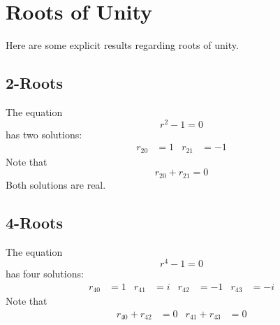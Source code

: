 \chapter{Roots of Unity}
Here are some explicit results regarding roots of unity.
\section{2-Roots}
The equation
\begin{equation}
    r^{2} - 1 = 0
\end{equation}
has two solutions:
\begin{align}
    r_{20} &= 1 & r_{21} &= {-1}
\end{align}
Note that
\begin{equation}
    r_{20} + r_{21} = 0
\end{equation}
Both solutions are real.
\section{4-Roots}
The equation
\begin{equation}
    r^{4} - 1 = 0
\end{equation}
has four solutions:
\begin{align}
    r_{40} &= 1 & r_{41} &= i & r_{42} &= -1 & r_{43} &= -i
    \label{eq.2.r4}
\end{align}
Note that
\begin{align}
    r_{40} + r_{42} &= 0 & r_{41} + r_{43} &= 0
\end{align}
